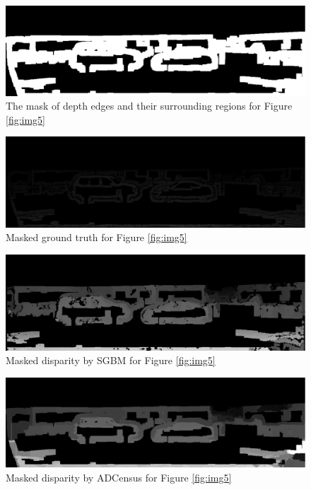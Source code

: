 \begin{figure}[H]
\centering
\includegraphics[width=\linewidth, scale=0.48]{5msk}
\caption{The mask of depth edges and their surrounding regions for Figure \protect\ref{fig:img5}}
\label{fig:msk}
\end{figure} 
\begin{figure}[H]
\centering
\includegraphics[width=\linewidth, scale=0.48]{5gt}
\caption{Masked ground truth for Figure \protect\ref{fig:img5}}
\label{fig:gtmsk}
\end{figure} 
\begin{figure}[H]
\centering
\includegraphics[width=\linewidth, scale=0.48]{5mdispsgb}
\caption{Masked disparity by SGBM for Figure \protect\ref{fig:img5}}
\label{fig:5mdispsgb}
\end{figure} 
\begin{figure}[H]
\centering
\includegraphics[width=\linewidth,scale=0.48]{5mdispadc}
\caption{Masked disparity by ADCensus for Figure \protect\ref{fig:img5}}
\label{fig:5mdispadc}
\end{figure} 

